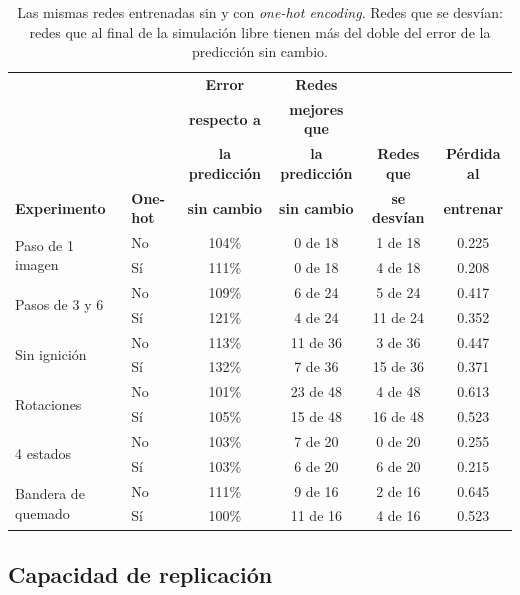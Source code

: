 	\begin{table}[htbp]
		\centering
		\footnotesize
		\setlength{\tabcolsep}{4pt}
		\begin{tabular}{llcccc}
			\toprule
			& & \textbf{Error} & \textbf{Redes} & & \\
			& & \textbf{respecto a} & \textbf{mejores que} & & \\
			& & \textbf{la predicción} & \textbf{la predicción} & \textbf{Redes que} & \textbf{Pérdida al} \\
			\textbf{Experimento} & \textbf{One-hot} & \textbf{sin cambio} & \textbf{sin cambio} & \textbf{se desvían} & \textbf{entrenar} \\ \midrule
			\multirow{2}{*}{Paso de 1 imagen} & No & 104\% & 0 de 18 & 1 de 18 & 0.225 \\
			& Sí & 111\% & 0 de 18 & 4 de 18 & 0.208 \\ \midrule
			\multirow{2}{*}{Pasos de 3 y 6} & No & 109\% & 6 de 24 & 5 de 24 & 0.417 \\
			& Sí & 121\% & 4 de 24 & 11 de 24 & 0.352 \\ \midrule
			\multirow{2}{*}{Sin ignición} & No & 113\% & 11 de 36 & 3 de 36 & 0.447 \\
			& Sí & 132\% & 7 de 36 & 15 de 36 & 0.371 \\ \midrule
			\multirow{2}{*}{Rotaciones} & No & 101\% & 23 de 48 & 4 de 48 & 0.613 \\
			& Sí & 105\% & 15 de 48 & 16 de 48 & 0.523 \\ \midrule
			\multirow{2}{*}{4 estados} & No & 103\% & 7 de 20 & 0 de 20 & 0.255 \\
			& Sí & 103\% & 6 de 20 & 6 de 20 & 0.215 \\ \midrule
			\multirow{2}{*}{Bandera de quemado} & No & 111\% & 9 de 16 & 2 de 16 & 0.645 \\
			& Sí & 100\% & 11 de 16 & 4 de 16 & 0.523 \\ \bottomrule
		\end{tabular}
		\caption{Las mismas redes entrenadas sin y con \textit{one-hot encoding}. Redes que se desvían: redes que al final de la simulación libre tienen más del doble del error de la predicción sin cambio.}
		\label{tab:flame_onehot}
	\end{table}

	\subsection{Capacidad de replicación}

